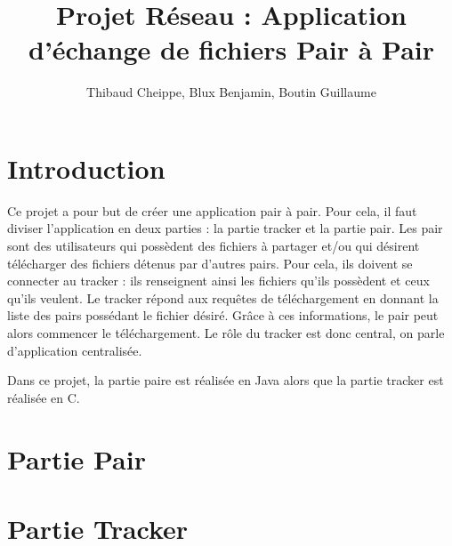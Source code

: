 \documentclass[a4paper,11pt]{report}
\title{Projet Réseau : Application d'échange de fichiers Pair à Pair}
\author{Thibaud Cheippe, Blux Benjamin, Boutin Guillaume}
\begin{document}
\maketitle



\section*{Introduction}

Ce projet a pour but de créer une application pair à pair. Pour cela, il faut diviser l'application en deux parties : la partie tracker et la partie pair.
Les pair sont des utilisateurs qui possèdent des fichiers à partager et/ou qui désirent télécharger des fichiers détenus par d'autres pairs. Pour cela, ils doivent se connecter au tracker : ils renseignent ainsi les fichiers qu'ils possèdent et ceux qu'ils veulent. Le tracker répond aux requêtes de téléchargement en donnant la liste des pairs possédant le fichier désiré. Grâce à ces informations, le pair peut alors commencer le téléchargement.
Le rôle du tracker est donc central, on parle d'application centralisée.

Dans ce projet, la partie paire est réalisée en Java alors que la partie tracker est réalisée en C.
\section*{Partie Pair} 


\section*{Partie Tracker}

\end{document}
